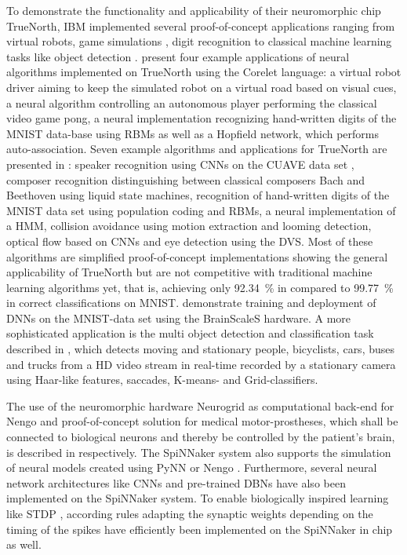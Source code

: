 To demonstrate the functionality and applicability of their neuromorphic chip TrueNorth, IBM implemented several proof-of-concept applications ranging from virtual robots, game simulations \parencite{Arthur2012}, digit recognition \parencite{Arthur2012, Esser2013} to classical machine learning tasks like object detection \parencite{Akopyan2015}.
\textcite{Arthur2012} present four example applications of neural algorithms implemented on TrueNorth using the Corelet language: a virtual robot driver aiming to keep the simulated robot on a virtual road based on visual cues, a neural algorithm controlling an autonomous player performing the classical video game pong, a neural implementation recognizing hand-written digits of the \ac{MNIST} data-base using \acp{RBM} as well as a Hopfield network, which performs auto-association.
Seven example algorithms and applications for TrueNorth are presented in \textcite{Esser2013}: speaker recognition using \acp{CNN} on the \ac{CUAVE} data set \parencite{Patterson2002}, composer recognition distinguishing between classical composers Bach and Beethoven using liquid state machines, recognition of hand-written digits of the \ac{MNIST} data set using population coding and \acp{RBM}, a neural implementation of a \ac{HMM}, collision avoidance using motion extraction and looming detection, optical flow based on \acp{CNN} and eye detection using the \ac{DVS}.
Most of these algorithms are simplified proof-of-concept implementations showing the general applicability of TrueNorth but are not competitive with traditional machine learning algorithms yet, that is, achieving only \SI{92.34}{\percent} in \textcite{Esser2013} compared to \SI{99.77}{\percent} in \textcite{Ciresan2012a} correct classifications on \ac{MNIST}.
\textcite{Schmitt2017} demonstrate training and deployment of \acp{DNN} on the \ac{MNIST}-data set using the \ac{BrainScaleS} hardware.
A more sophisticated application is the multi object detection and classification task described in \textcite{Akopyan2015}, which detects moving and stationary people, bicyclists, cars, buses and trucks from a HD video stream in real-time recorded by a stationary camera using Haar-like features, saccades, K-means- and Grid-classifiers.

The use of the neuromorphic hardware Neurogrid \parencite{Benjamin2014} as computational back-end for \ac{Nengo} and proof-of-concept solution for medical motor-prostheses, which shall be connected to biological neurons and thereby be controlled by the patient's brain, is described in \textcite{Choudhary2012, Dethier2011} respectively.
The \ac{SpiNNaker} system \parencite{Furber2014} also supports the simulation of neural models created using \ac{PyNN} or \ac{Nengo} \parencite{Mundy2015}.
Furthermore, several neural network architectures like \acp{CNN} \parencite{Serrano-Gotarredona2015} and pre-trained \acp{DBN} \parencite{Stromatias2015a, Stromatias2015} have also been implemented on the \ac{SpiNNaker} system.
To enable biologically inspired learning like \ac{STDP} \parencite{Bi2001}, according rules adapting the synaptic weights depending on the timing of the spikes have efficiently been implemented on the \ac{SpiNNaker} in \textcite{Diehl2014} chip as well.

